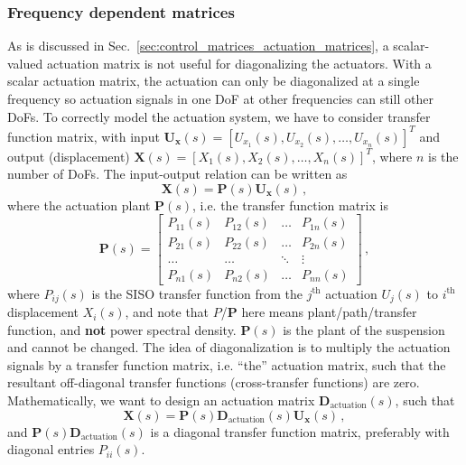 \subsubsection{Frequency dependent matrices \label{sec:control_matrices_frequency_dependent_matrices}}
As is discussed in Sec.~\ref{sec:control_matrices_actuation_matrices}, a scalar-valued actuation matrix is not useful for diagonalizing the actuators.
With a scalar actuation matrix, the actuation can only be diagonalized at a single frequency so actuation signals in one DoF at other frequencies can still other DoFs.
To correctly model the actuation system, we have to consider transfer function matrix, with input $\mathbf{U}_\mathbf{x}(s)=\left[U_{x_1}(s), U_{x_2}(s),\dots,U_{x_n}(s)\right]^T$ and output (displacement) $\mathbf{X}(s)=[X_1(s), X_2(s),\dots, X_n(s)]^T$, where $n$ is the number of  DoFs.
The input-output relation can be written as
\begin{equation}
	\mathbf{X}(s) = \mathbf{P}(s)\mathbf{U}_\mathbf{x}(s)\,,
\end{equation}
where the actuation plant $\mathbf{P}(s)$, i.e. the transfer function matrix is
\begin{equation}
	\mathbf{P}(s)=
	\begin{bmatrix}
		P_{11}(s) & P_{12}(s) & \dots & P_{1n}(s)\\
		P_{21}(s) & P_{22}(s) & \dots & P_{2n}(s)\\
		\dots & \dots & \ddots & \vdots\\
		P_{n1}(s) & P_{n2}(s) & \dots & P_{nn}(s)
	\end{bmatrix}\,,
\end{equation}
where $P_{ij}(s)$ is the SISO transfer function from the $j^\mathrm{th}$ actuation $U_j(s)$ to $i^\mathrm{th}$ displacement $X_i(s)$, and note that $P$/$\mathbf{P}$ here means plant/path/transfer function, and \textbf{not} power spectral density.
$\mathbf{P}(s)$ is the plant of the suspension and cannot be changed. 
The idea of diagonalization is to multiply the actuation signals by a transfer function matrix, i.e. ``the'' actuation matrix, such that the resultant off-diagonal transfer functions (cross-transfer functions) are zero.
Mathematically, we want to design an actuation matrix $\mathbf{D}_\mathrm{actuation}(s)$, such that
\begin{equation}
	\mathbf{X}(s) = \mathbf{P}(s)\mathbf{D}_\mathrm{actuation}(s)\mathbf{U}_\mathbf{x}(s)\,,
\end{equation}
and $\mathbf{P}(s)\mathbf{D}_\mathrm{actuation}(s)$ is a diagonal transfer function matrix, preferably with diagonal entries $P_{ii}(s)$.
